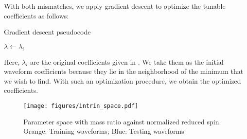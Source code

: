\documentclass[twocolumn]{aastex631}
\begin{document}
With both mismatches, we apply gradient descent to optimize the tunable coefficients as follows: 
\begin{algorithm}
	\caption{Gradient descent pseudocode}
	$\lambda\leftarrow\lambda_i$\\
	\Return{$\lambda$}
\end{algorithm}
Here, $\lambda_i$ are the original coefficients given in \citep{khan2016frequency}. We take them as the initial waveform coefficients because they lie in the neighborhood of the minimum that we wish to find. With such an optimization procedure, we obtain the optimized coefficients. 

\begin{figure}[t]
	\centering
	\texttt{[image: figures/intrin\_space.pdf]}
	\caption{Parameter space with mass ratio against normalized reduced spin. Orange: Training waveforms; Blue: Testing waveforms}
	\label{fig:intrin_space}
\end{figure}
\end{document}
